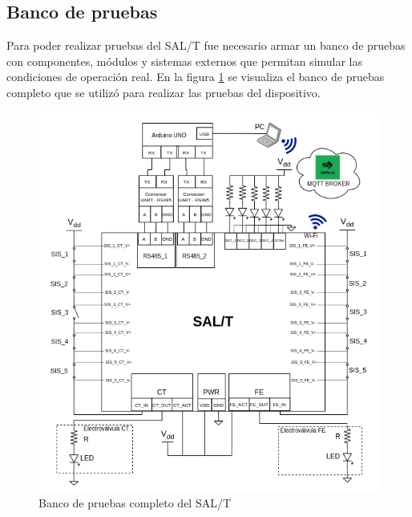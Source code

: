 
\subsection{Banco de pruebas}


Para poder realizar pruebas del SAL/T fue necesario armar un banco de pruebas con componentes, módulos y sistemas externos que permitan simular las condiciones de operación real. En la figura \ref{fig:testbench} se visualiza el banco de pruebas completo que se utilizó para realizar las pruebas del dispositivo. 


\begin{figure}[H]
    \centering
    \includegraphics[width = \linewidth]{img/testbench.png}
    \caption{Banco de pruebas completo del SAL/T}
    \label{fig:testbench}
\end{figure}


